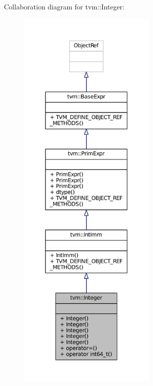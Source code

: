 Collaboration diagram for tvm\+:\+:Integer\+:
\nopagebreak
\begin{figure}[H]
\begin{center}
\leavevmode
\includegraphics[height=550pt]{classtvm_1_1Integer__coll__graph}
\end{center}
\end{figure}
